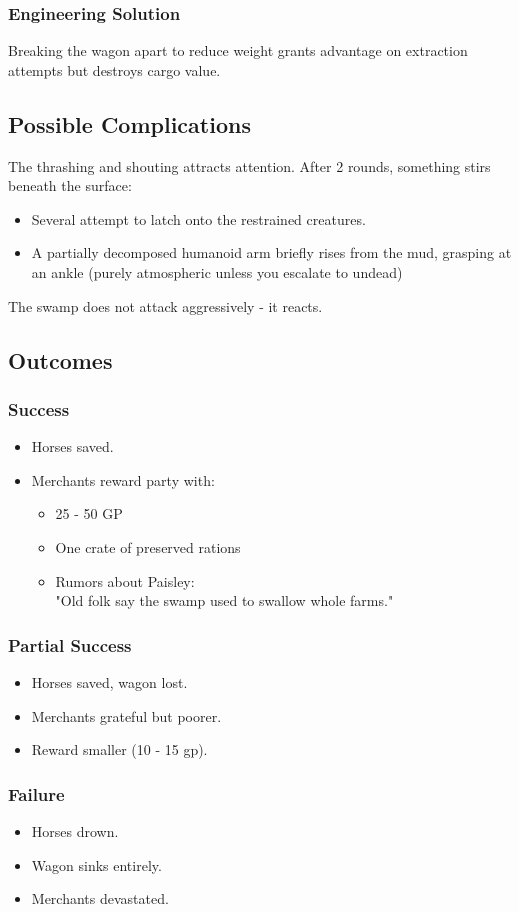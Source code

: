 \subsubsection*{Engineering Solution}
{\entryfont Breaking the wagon apart to reduce weight grants advantage on extraction attempts but destroys cargo value.}

\subsection*{Possible Complications}
{\entryfont The thrashing and shouting attracts attention. After 2 rounds, something stirs beneath the surface:
\begin{itemize}
	\item Several \hyperref[monster:BloodLeech]{} attempt to latch onto the restrained creatures.
	\item A partially decomposed humanoid arm briefly rises from the mud, grasping at an ankle (purely atmospheric unless you escalate to undead)
\end{itemize}
The swamp does not attack aggressively - it reacts.}

\subsection*{Outcomes}
\subsubsection*{Success}
{\entryfont\begin{itemize}
	\item Horses saved.
	\item Merchants reward party with:
	\begin{itemize}
		\item 25 - 50 GP
		\item One crate of preserved rations
		\item Rumors about Paisley:\\"Old folk say the swamp used to swallow whole farms."
	\end{itemize}
\end{itemize}}
\subsubsection*{Partial Success}
{\entryfont\begin{itemize}
	\item Horses saved, wagon lost.
	\item Merchants grateful but poorer.
	\item Reward smaller (10 - 15 gp).
\end{itemize}}
\subsubsection*{Failure}
{\entryfont\begin{itemize}
	\item Horses drown.
	\item Wagon sinks entirely.
	\item Merchants devastated.
\end{itemize}}